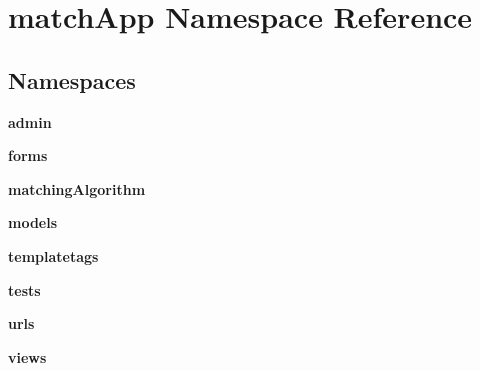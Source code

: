 \section{match\+App Namespace Reference}
\label{namespacematch_app}
\subsection*{Namespaces}
\begin{DoxyCompactItemize}
\item 
 {\bf admin}
\item 
 {\bf forms}
\item 
 {\bf matching\+Algorithm}
\item 
 {\bf models}
\item 
 {\bf templatetags}
\item 
 {\bf tests}
\item 
 {\bf urls}
\item 
 {\bf views}
\end{DoxyCompactItemize}

